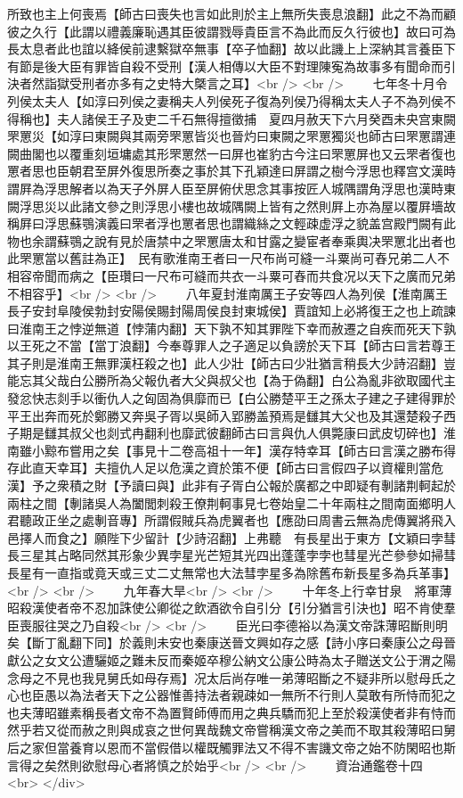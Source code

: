 所致也主上何喪焉【師古曰喪失也言如此則於主上無所失喪息浪翻】此之不為而顧彼之久行【此謂以禮義廉恥遇其臣彼謂戮辱貴臣言不為此而反久行彼也】故曰可為長太息者此也誼以絳侯前逮繫獄卒無事【卒子恤翻】故以此譏上上深納其言養臣下有節是後大臣有罪皆自殺不受刑【漢人相傳以大臣不對理陳寃為故事多有聞命而引決者然詣獄受刑者亦多有之史特大槩言之耳】<br />
<br />
　　七年冬十月令列侯太夫人【如淳曰列侯之妻稱夫人列侯死子復為列侯乃得稱太夫人子不為列侯不得稱也】夫人諸侯王子及吏二千石無得擅徵捕　夏四月赦天下六月癸酉未央宫東闕罘罳災【如淳曰東闕與其兩旁罘罳皆災也晉灼曰東闕之罘罳獨災也師古曰罘罳謂連闕曲閣也以覆重刻垣墉處其形罘罳然一曰屏也崔豹古今注曰罘罳屏也又云罘者復也罳者思也臣朝君至屏外復思所奏之事於其下孔穎達曰屏謂之樹今浮思也釋宫文漢時謂屛為浮思解者以為天子外屏人臣至屏俯伏思念其事按匠人城隅謂角浮思也漢時東闕浮思災以此諸文參之則浮思小樓也故城隅闕上皆有之然則屛上亦為屋以覆屛墻故稱屛曰浮思蘇鶚演義曰罘者浮也罳者思也謂織絲之文輕疎虚浮之貌盖宫殿門闕有此物也余謂蘇鶚之說有見於唐禁中之罘罳唐太和甘露之變宦者奉乘輿决罘罳北出者也此罘罳當以舊註為正】　民有歌淮南王者曰一尺布尚可縫一斗粟尚可舂兄弟二人不相容帝聞而病之【臣瓚曰一尺布可縫而共衣一斗粟可舂而共食况以天下之廣而兄弟不相容乎】<br />
<br />
　　八年夏封淮南厲王子安等四人為列侯【淮南厲王長子安封阜陵侯勃封安陽侯賜封陽周侯良封東城侯】賈誼知上必將復王之也上疏諫曰淮南王之悖逆無道【悖蒲内翻】天下孰不知其罪陛下幸而赦遷之自疾而死天下孰以王死之不當【當丁浪翻】今奉尊罪人之子適足以負謗於天下耳【師古曰言若尊王其子則是淮南王無罪漢枉殺之也】此人少壯【師古曰少壯猶言稍長大少詩沼翻】豈能忘其父哉白公勝所為父報仇者大父與叔父也【為于偽翻】白公為亂非欲取國代主發忿快志剡手以衝仇人之匈固為俱靡而已【白公勝楚平王之孫太子建之子建得罪於平王出奔而死於鄭勝又奔吳子胥以吳師入郢勝盖預焉是讎其大父也及其還楚殺子西子期是讎其叔父也剡式冉翻利也靡武彼翻師古曰言與仇人俱斃康曰武皮切碎也】淮南雖小黥布嘗用之矣【事見十二卷高祖十一年】漢存特幸耳【師古曰言漢之勝布得存此直天幸耳】夫擅仇人足以危漢之資於策不便【師古曰言假四子以資權則當危漢】予之衆積之財【予讀曰與】此非有子胥白公報於廣都之中即疑有剸諸荆軻起於兩柱之間【剸諸吳人為闔閭刺殺王僚荆軻事見七卷始皇二十年兩柱之間南面鄉明人君聽政正坐之處剸音專】所謂假賊兵為虎翼者也【應劭曰周書云無為虎傳翼將飛入邑擇人而食之】願陛下少留計【少詩沼翻】上弗聽　有長星出于東方【文穎曰孛彗長三星其占略同然其形象少異孛星光芒短其光四出蓬蓬孛孛也彗星光芒參參如掃彗長星有一直指或竟天或三丈二丈無常也大法彗孛星多為除舊布新長星多為兵革事】<br />
<br />
　　九年春大旱<br />
<br />
　　十年冬上行幸甘泉　將軍薄昭殺漢使者帝不忍加誅使公卿從之飲酒欲令自引分【引分猶言引決也】昭不肯使羣臣喪服往哭之乃自殺<br />
<br />
　　臣光曰李德裕以為漢文帝誅薄昭斷則明矣【斷丁亂翻下同】於義則未安也秦康送晉文興如存之感【詩小序曰秦康公之母晉獻公之女文公遭驪姬之難未反而秦姬卒穆公納文公康公時為太子贈送文公于渭之陽念母之不見也我見舅氏如母存焉】况太后尚存唯一弟薄昭斷之不疑非所以慰母氏之心也臣愚以為法者天下之公器惟善持法者親疎如一無所不行則人莫敢有所恃而犯之也夫薄昭雖素稱長者文帝不為置賢師傅而用之典兵驕而犯上至於殺漢使者非有恃而然乎若又從而赦之則與成哀之世何異哉魏文帝嘗稱漢文帝之美而不取其殺薄昭曰舅后之家但當養育以恩而不當假借以權既觸罪法又不得不害譏文帝之始不防閑昭也斯言得之矣然則欲慰母心者將慎之於始乎<br />
<br />
　　資治通鑑卷十四  <br>
   </div> 

